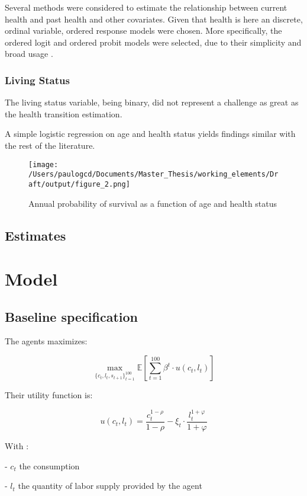\documentclass{article}
\begin{document}
Several methods were considered to estimate the relationship between current health and past health and other covariates. 
Given that health is here an discrete, ordinal variable, ordered response models were chosen.
More specifically, the ordered logit and ordered probit models were selected, due to their simplicity and broad usage \parencite{Wooldridge_2010}.

\subsubsection{Living Status}

The living status variable, being binary, did not represent a challenge
as great as the health transition estimation.

A simple logistic regression on age and health status yields findings similar with the
rest of the literature. 

\begin{figure}[H]
    \texttt{[image: /Users/paulogcd/Documents/Master\_Thesis/working\_elements/Draft/output/figure\_2.png]}
    \caption{Annual probability of survival as a function of age and health status}
\end{figure}


\subsection{Estimates}

\section{Model}

\subsection{Baseline specification }

The agents maximizes: 

$$ \max_{\{c_{t},l_{t},s_{t+1}\}_{t=1}^{100}}{\mathbb{E}\left[\sum_{t=1}^{100} \beta^{t}\cdot u(c_t,l_t)\right]}$$

Their utility function is: 

$$u(c_{t},l_{t}) = \frac{c_{t}^{1-\rho}}{1-\rho}-\xi_{t}\cdot \frac{l_{t}^{1+\varphi}}{1+\varphi}$$

With : 

-  $c_{t}$  the consumption

-  $l_{t}$  the quantity of labor supply provided by the agent
\end{document}
